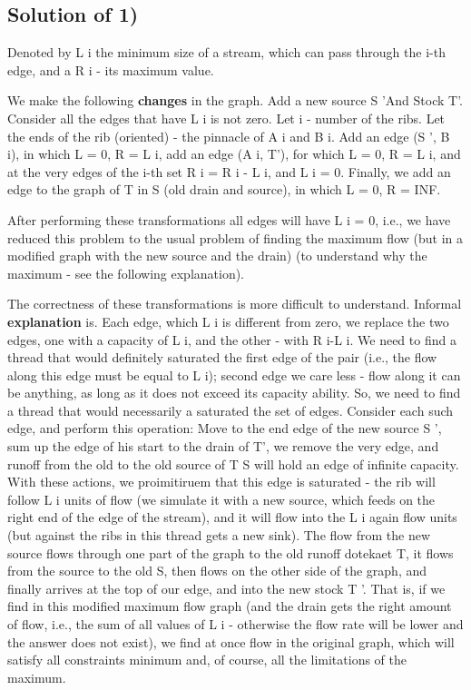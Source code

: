 \subsection{ Solution of 1) }
Denoted by L i the minimum size of a stream, which can pass through the i-th edge, and a R i - its maximum value.

We make the following \textbf{changes} in the graph. Add a new source S 'And Stock T'. Consider all the edges that have L i is not zero. Let i - number of the ribs. Let the ends of the rib (oriented) - the pinnacle of A i and B i. Add an edge (S ', B i), in which L = 0, R = L i, add an edge (A i, T'), for which L = 0, R = L i, and at the very edges of the i-th set R i = R i - L i, and L i = 0. Finally, we add an edge to the graph of T in S (old drain and source), in which L = 0, R = INF.

After performing these transformations all edges will have L i = 0, i.e., we have reduced this problem to the usual problem of finding the maximum flow (but in a modified graph with the new source and the drain) (to understand why the maximum - see the following explanation).

The correctness of these transformations is more difficult to understand. Informal \textbf{explanation} is. Each edge, which L i is different from zero, we replace the two edges, one with a capacity of L i, and the other - with R i-L i. We need to find a thread that would definitely saturated the first edge of the pair (i.e., the flow along this edge must be equal to L i); second edge we care less - flow along it can be anything, as long as it does not exceed its capacity ability. So, we need to find a thread that would necessarily a saturated the set of edges. Consider each such edge, and perform this operation: Move to the end edge of the new source S ', sum up the edge of his start to the drain of T', we remove the very edge, and runoff from the old to the old source of T S will hold an edge of infinite capacity. With these actions, we proimitiruem that this edge is saturated - the rib will follow L i units of flow (we simulate it with a new source, which feeds on the right end of the edge of the stream), and it will flow into the L i again flow units (but against the ribs in this thread gets a new sink). The flow from the new source flows through one part of the graph to the old runoff dotekaet T, it flows from the source to the old S, then flows on the other side of the graph, and finally arrives at the top of our edge, and into the new stock T '. That is, if we find in this modified maximum flow graph (and the drain gets the right amount of flow, i.e., the sum of all values ​​of L i - otherwise the flow rate will be lower and the answer does not exist), we find at once flow in the original graph, which will satisfy all constraints minimum and, of course, all the limitations of the maximum.

